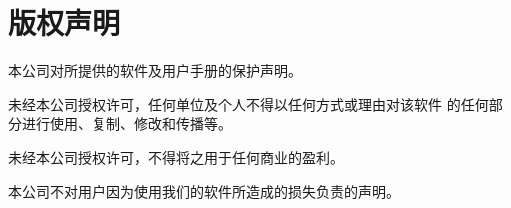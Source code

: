 \chapter{版权声明}
\par 本公司对所提供的软件及用户手册的保护声明。
\par 未经本公司授权许可，任何单位及个人不得以任何方式或理由对该软件
的任何部分进行使用、复制、修改和传播等。
\par 未经本公司授权许可，不得将之用于任何商业的盈利。
\par 本公司不对用户因为使用我们的软件所造成的损失负责的声明。
